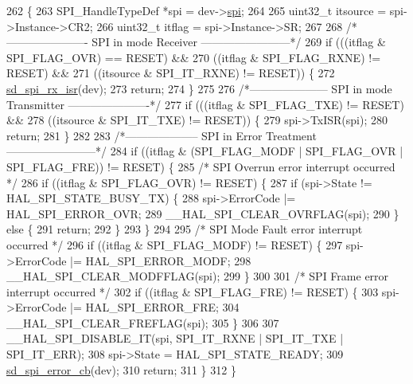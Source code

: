 \begin{DoxyCode}
262 \{
263     SPI\_HandleTypeDef *spi = dev->\mbox{\hyperlink{structsd__spi__dev_a06909907ded69cbc00db1f401a90f8ee}{spi}};
264 
265     uint32\_t itsource = spi->Instance->CR2;
266     uint32\_t itflag   = spi->Instance->SR;
267 
268     \textcolor{comment}{/*---------------------- SPI in mode Receiver ------------------------*/}
269     \textcolor{keywordflow}{if} (((itflag & SPI\_FLAG\_OVR) == RESET) &&
270         ((itflag & SPI\_FLAG\_RXNE) != RESET) && 
271         ((itsource & SPI\_IT\_RXNE) != RESET)) \{
272         \mbox{\hyperlink{group___s_d___s_p_i___functions_ga8f8403c9f68c9a623486a29cf8715fda}{sd\_spi\_rx\_isr}}(dev);
273         \textcolor{keywordflow}{return};
274     \}
275 
276     \textcolor{comment}{/*--------------------- SPI in mode Transmitter ----------------------*/}
277     \textcolor{keywordflow}{if} (((itflag & SPI\_FLAG\_TXE) != RESET) && 
278         ((itsource & SPI\_IT\_TXE) != RESET)) \{
279         spi->TxISR(spi);
280         \textcolor{keywordflow}{return};
281     \}
282 
283     \textcolor{comment}{/*-------------------- SPI in Error Treatment ------------------------*/}
284     \textcolor{keywordflow}{if} ((itflag & (SPI\_FLAG\_MODF | SPI\_FLAG\_OVR | SPI\_FLAG\_FRE)) != RESET) \{
285         \textcolor{comment}{/* SPI Overrun error interrupt occurred */}
286         \textcolor{keywordflow}{if} ((itflag & SPI\_FLAG\_OVR) != RESET) \{
287             \textcolor{keywordflow}{if} (spi->State != HAL\_SPI\_STATE\_BUSY\_TX) \{
288                 spi->ErrorCode |= HAL\_SPI\_ERROR\_OVR;
289                 \_\_HAL\_SPI\_CLEAR\_OVRFLAG(spi);
290             \} \textcolor{keywordflow}{else} \{
291                 \textcolor{keywordflow}{return};
292             \}
293         \}
294 
295         \textcolor{comment}{/* SPI Mode Fault error interrupt occurred */}
296         \textcolor{keywordflow}{if} ((itflag & SPI\_FLAG\_MODF) != RESET) \{
297             spi->ErrorCode |= HAL\_SPI\_ERROR\_MODF;
298             \_\_HAL\_SPI\_CLEAR\_MODFFLAG(spi);
299         \}
300 
301         \textcolor{comment}{/* SPI Frame error interrupt occurred */}
302         \textcolor{keywordflow}{if} ((itflag & SPI\_FLAG\_FRE) != RESET) \{
303             spi->ErrorCode |= HAL\_SPI\_ERROR\_FRE;
304             \_\_HAL\_SPI\_CLEAR\_FREFLAG(spi);
305         \}
306 
307         \_\_HAL\_SPI\_DISABLE\_IT(spi, SPI\_IT\_RXNE | SPI\_IT\_TXE | SPI\_IT\_ERR);
308         spi->State = HAL\_SPI\_STATE\_READY;
309         \mbox{\hyperlink{group___s_d___s_p_i___functions_ga3515d67aa70e65e562b55011aface3b9}{sd\_spi\_error\_cb}}(dev);
310         \textcolor{keywordflow}{return};
311     \}
312 \}
\end{DoxyCode}
\mbox{\label{group___s_d___s_p_i___functions_gad3e4aa819e8e76a92816be83ca2702c9}} 
